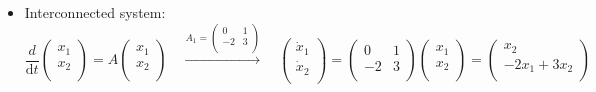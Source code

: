 \begin{ex}{}
\begin{itemize}
\item Interconnected system:
\begin{equation*}
\frac{d}{\mathrm{d}t} 
\begin{pmatrix}
x_{1}\\
x_{2}\\
\end{pmatrix}
=A
\begin{pmatrix}
x_{1}\\
x_{2}\\
\end{pmatrix}\quad \xrightarrow{A_{1}=\begin{pmatrix}
0 & 1\\
-2 & 3\\
\end{pmatrix}} \quad 
\begin{pmatrix}
\dot{x}_{1}\\
\dot{x}_{2}\\
\end{pmatrix} = 
\begin{pmatrix}
0 & 1\\
-2 & 3\\
\end{pmatrix}
\begin{pmatrix}
x_{1}\\
x_{2}\\
\end{pmatrix} = \begin{pmatrix}
x_{2}\\
-2x_{1}+3x_{2}\\
\end{pmatrix}
\end{equation*}


\end{itemize}
\end{ex}
